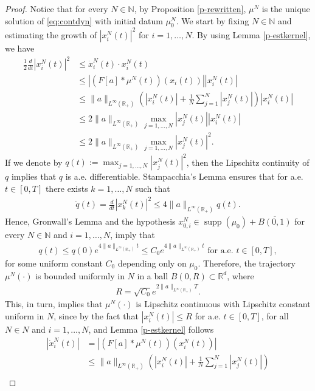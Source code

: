 \documentclass[A4paper,11pt]{article}
\theoremstyle{definition}
\newcommand{\N}{\mathbb{N}}
\newcommand{\R}{\mathbb{R}}
\DeclareMathOperator{\supp}{supp}
\begin{document}
\begin{proof}
Notice that for every $N \in \N$, by Proposition \ref{p-rewritten}, $\mu^N$ is the unique solution of \eqref{eq:contdyn} with initial datum $\mu^N_0$. We start by fixing $N \in \N$ and estimating the growth of $|x_i^N(t)|^2$ for $i = 1, \ldots, N$. By using Lemma \ref{p-estkernel}, we have
\begin{align*}
\frac{1}{2}\frac{d}{dt} |x_i^N(t)|^2 & \leq \dot{x}_i^N(t) \cdot x_i^N(t) \\
& \leq \left|(F[a]*\mu^N(t))(x_i(t))\right| |x_i^N(t)| \\
& \leq \|a\|_{L^{\infty}(\R_+)}\left( |x_i^N(t)| + \frac{1}{N} \sum^N_{j = 1}|x_j^N(t)| \right) |x_i^N(t)| \\
& \leq 2 \|a\|_{L^{\infty}(\R_+)}\max_{j = 1, \ldots, N} |x_j^N(t)| |x_i^N(t)| \\
& \leq 2 \|a\|_{L^{\infty}(\R_+)}\max_{j = 1, \ldots, N} |x_j^N(t)|^2.
\end{align*}
If we denote by $q(t) := \max_{j = 1, \ldots, N} |x_j^N(t)|^2$, then the Lipschitz continuity of $q$ implies that $q$ is a.e. differentiable. Stampacchia's Lemma \cite[Chapter 2, Lemma A.4]{Kin-Sta} ensures that for a.e. $t \in [0,T]$ there exists $k = 1, \ldots, N$ such that
\begin{align*}
\dot{q}(t) = \frac{d}{dt} |x_k^N(t)|^2 \leq 4 \|a\|_{L^{\infty}(\R_+)} q(t).
\end{align*}
Hence, Gronwall's Lemma and the hypothesis $x^{N}_{0,i} \in \supp(\mu_0) + \overline{B(0,1)}$ for every $N \in \N$ and $i = 1, \ldots, N$, imply that
\begin{align*}
q(t) \leq q(0) e^{4 \|a\|_{L^{\infty}(\R_+)} t} \leq C_0 e^{4 \|a\|_{L^{\infty}(\R_+)} t} \text{ for a.e. } t \in [0,T],
\end{align*}
for some uniform constant $C_0$ depending only on $\mu_0$. Therefore, the trajectory $\mu^N(\cdot)$ is bounded uniformly in $N$ in a ball $B(0,R) \subset \R^d$, where
\begin{align}\label{Rest}
R =  \sqrt{C_0} e^{2 \|a\|_{L^{\infty}(\R_+)} T}.
\end{align}
This, in turn, implies that $\mu^N(\cdot)$ is Lipschitz continuous with Lipschitz constant uniform in $N$, since by the fact that $|x^N_i(t)| \leq R$ for a.e. $t \in [0,T]$, for all $N \in N$ and $i = 1, \ldots, N$, and Lemma \ref{p-estkernel} follows
\begin{align*}
|\dot{x}^N_i(t)| &= |(F[a]*\mu^N(t))(x^N_i(t))| \\
&\leq \|a\|_{L^{\infty}(\R_+)} \left( |x^N_i(t)| + \frac{1}{N}\sum^N_{j = 1}|x^N_j(t)|\right) \\

\end{align*}
\end{proof}
\end{document}
